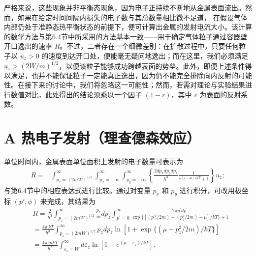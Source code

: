 严格来说，这些现象并非平衡态现象，因为电子正持续不断地从金属表面流出。然而，如果在给定时间间隔内损失的电子数与其总数量相比微不足道，
在假设气体内部仍处于准静态热平衡状态的前提下，便可计算出金属的发射电流大小。该计算的数学方法与第6.4节中所采用的方法基本一致——用于确定气体粒子通过容器壁开口逸出的速率 \(R\)。不过，二者存在一个细微差别：在扩散过程中，只要任何粒子以 \(u_{z} > 0\) 的速度到达开口处，便能毫无疑问地逸出；而在这里，我们必须满足 \(u_{z} > (2W/m)^{1/2}\)，以便该粒子能够成功跨越表面的势垒。此外，即便上述条件得以满足，也并不能保证粒子一定能真正逸出，因为仍不能完全排除向内反射的可能性。在接下来的讨论中，我们将忽略这一可能性；然而，若需对理论与实验结果进行数值对比，此处得出的结论须乘以一个因子 \((1 - r)\)，其中 \(r\) 为表面的反射系数。
\section{A 热电子发射（理查德森效应）}\label{a-ux70edux7535ux5b50ux53d1ux5c04ux7406ux67e5ux5fb7ux68eeux6548ux5e94}
单位时间内，金属表面单位面积上发射的电子数量可表示为
\begin{equation}\tag{8.3.7}\label{eq:8.3.7}
\begin{array}{rl} { R = } & { { } \displaystyle \int _ { p _ { z } = ( 2 m W ) ^{1 / 2} } ^{\infty} \int _ { p _ { x } = - \infty } ^{\infty} \int _ { p _ { y } = - \infty } ^{\infty} \left\{ \frac { 2 d p _ { x } d p _ { y } d p _ { z } } { h ^{3} } \frac { 1 } { e ^{( \varepsilon - \mu ) / k T} + 1 } \right\} u _ { z } ; } \end{array}
\end{equation}
与第6.4节中的相应表达式进行比较。通过对变量 \(p_{x}\) 和 \(p_{y}\) 进行积分，可改用极坐标 \((p', \phi)\) 来完成，其结果为
\begin{equation}\tag{8.3.8}\label{eq:8.3.8}
\begin{array}{rl} & { R = \frac { 2 } { h ^{3} }  \int _ { p _ { z } = ( 2 m W ) ^{1 / 2} } ^{\infty} \frac { p _ { z } } { m } d p _ { z } \int _ { p ^{\prime} = 0 } ^{\infty} \frac { 2 \pi p ^{\prime} d p ^{\prime} } { \exp \{ [ ( p ^{\prime 2} / 2 m ) + ( p _ { z } ^{2} / 2 m ) - \mu ] / k T \} + 1 } } \\& { = \frac { 4 \pi \, k T } { h ^{3} }  \int _ { p _ { z } = ( 2 m W ) ^{1 / 2} } ^{\infty} p _ { z } d p _ { z } \ln [ 1 + \exp \{ ( \mu - p _ { z } ^{2} / 2 m ) / k T \} ] } \\& { = \frac { 4 \pi \, m k T } { h ^{3} } \int _ { \varepsilon _ { z } = W } ^{\infty} d \varepsilon _ { z } \ln [ 1 + e ^{( \mu - \varepsilon _ { z} ) / k T } ] . } \end{array}
\end{equation}
